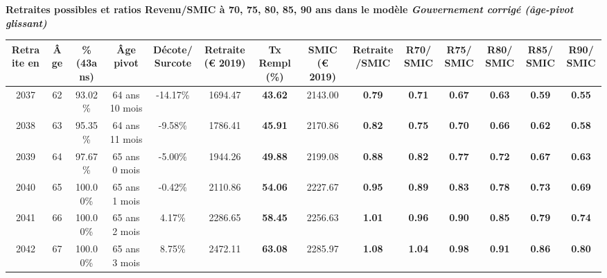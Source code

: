  \vspace{0.1cm} 
{\bf \noindent Retraites possibles et ratios Revenu/SMIC à 70, 75, 80, 85, 90 ans dans le modèle \emph{Gouvernement corrigé (âge-pivot glissant)}}  
 
\begin{adjustbox}{max width=\textwidth} 
\begin{tabular}[htb]{|c|c||c|c|c||c|c||c|c||c|c|c|c|c|} 
\hline 
 Retraite en &  Âge &  \%(43ans) &  Âge pivot &  Décote/Surcote &  Retraite (\euro{} 2019) &  Tx Rempl(\%) &  SMIC (\euro{} 2019) &  Retraite/SMIC &  R70/SMIC &  R75/SMIC &  R80/SMIC &  R85/SMIC &  R90/SMIC \\ 
\hline \hline 
 2037 &  62 &  93.02\% &  64 ans 10 mois &  -14.17\% &  1694.47 &  {\bf 43.62} &  2143.00 &  {\bf {\color{red} 0.79}} &  {\bf {\color{red} 0.71}} &  {\bf {\color{red} 0.67}} &  {\bf {\color{red} 0.63}} &  {\bf {\color{red} 0.59}} &  {\bf {\color{red} 0.55}} \\ 
\hline 
 2038 &  63 &  95.35\% &  64 ans 11 mois &  -9.58\% &  1786.41 &  {\bf 45.91} &  2170.86 &  {\bf {\color{red} 0.82}} &  {\bf {\color{red} 0.75}} &  {\bf {\color{red} 0.70}} &  {\bf {\color{red} 0.66}} &  {\bf {\color{red} 0.62}} &  {\bf {\color{red} 0.58}} \\ 
\hline 
 2039 &  64 &  97.67\% &  65 ans 0 mois &  -5.00\% &  1944.26 &  {\bf 49.88} &  2199.08 &  {\bf {\color{red} 0.88}} &  {\bf {\color{red} 0.82}} &  {\bf {\color{red} 0.77}} &  {\bf {\color{red} 0.72}} &  {\bf {\color{red} 0.67}} &  {\bf {\color{red} 0.63}} \\ 
\hline 
 2040 &  65 &  100.00\% &  65 ans 1 mois &  -0.42\% &  2110.86 &  {\bf 54.06} &  2227.67 &  {\bf {\color{red} 0.95}} &  {\bf {\color{red} 0.89}} &  {\bf {\color{red} 0.83}} &  {\bf {\color{red} 0.78}} &  {\bf {\color{red} 0.73}} &  {\bf {\color{red} 0.69}} \\ 
\hline 
 2041 &  66 &  100.00\% &  65 ans 2 mois &  4.17\% &  2286.65 &  {\bf 58.45} &  2256.63 &  {\bf 1.01} &  {\bf {\color{red} 0.96}} &  {\bf {\color{red} 0.90}} &  {\bf {\color{red} 0.85}} &  {\bf {\color{red} 0.79}} &  {\bf {\color{red} 0.74}} \\ 
\hline 
 2042 &  67 &  100.00\% &  65 ans 3 mois &  8.75\% &  2472.11 &  {\bf 63.08} &  2285.97 &  {\bf 1.08} &  {\bf 1.04} &  {\bf {\color{red} 0.98}} &  {\bf {\color{red} 0.91}} &  {\bf {\color{red} 0.86}} &  {\bf {\color{red} 0.80}} \\ 
\hline 
\hline 
\end{tabular} 
\end{adjustbox} 
 
